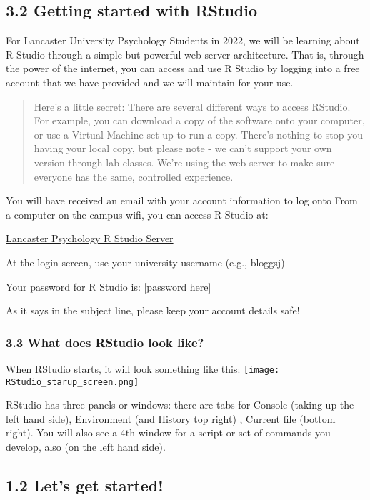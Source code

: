 \documentclass[
]{book}
\begin{document}
\hypertarget{getting_started}{%
\subsection{3.2 Getting started with RStudio}\label{getting_started}}

For Lancaster University Psychology Students in 2022, we will be
learning about R Studio through a simple but powerful web server
architecture. That is, through the power of the internet, you can access and use R Studio by logging into a free account that we have provided and we will maintain for your use.

\begin{quote}
Here's a little secret: There are several different ways to access
RStudio. For example, you can download a copy of the software onto
your computer, or use a Virtual Machine set up to run a copy. There's
nothing to stop you having your local copy, but please note - we can't
support your own version through lab classes. We're using the web
server to make sure everyone has the same, controlled experience.
\end{quote}

You will have received an email with your account information to log onto
From a computer on the campus wifi, you can access R Studio at:

\href{http://psy-rstudio.lancaster.ac.uk}{Lancaster Psychology R Studio
Server}

At the login screen, use your university username (e.g., bloggsj)

Your password for R Studio is: {[}password here{]}

As it says in the subject line, please keep your account details safe!

\hypertarget{what-does-rstudio-look-like}{%
\subsubsection{3.3 What does RStudio look like?}\label{what-does-rstudio-look-like}}

When RStudio starts, it will look something like this: \texttt{[image: RStudio\_starup\_screen.png]}

RStudio has three panels or windows: there are tabs for Console (taking up the left hand side), Environment (and History top right) , Current file (bottom right). You will also see a 4th window for a script or set of commands you develop, also (on the left hand side).

\hypertarget{lets-get-started}{%
\subsection{1.2 Let's get started!}\label{lets-get-started}}
\end{document}
